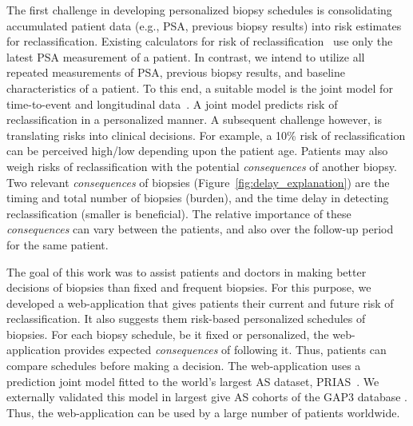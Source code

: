 The first challenge in developing personalized biopsy schedules is consolidating accumulated patient data (e.g., PSA, previous biopsy results) into risk estimates for reclassification. Existing calculators for risk of reclassification~\citep{partin1993use,makarov2007updated} use only the latest PSA measurement of a patient. In contrast, we intend to utilize all repeated measurements of PSA, previous biopsy results, and baseline characteristics of a patient. To this end, a suitable model is the joint model for time-to-event and longitudinal data~\citep{tomer2019, coley2017prediction,rizopoulos2012joint}. A joint model predicts risk of reclassification in a personalized manner. A subsequent challenge however, is translating risks into clinical decisions. For example, a 10\% risk of reclassification can be perceived high/low depending upon the patient age. Patients may also weigh risks of reclassification with the potential \textit{consequences} of another biopsy. Two relevant \textit{consequences} of biopsies (Figure~\ref{fig:delay_explanation}) are the timing and total number of biopsies (burden), and the time delay in detecting reclassification (smaller is beneficial). The relative importance of these \textit{consequences} can vary between the patients, and also over the follow-up period for the same patient.

The goal of this work was to assist patients and doctors in making better decisions of biopsies than fixed and frequent biopsies. For this purpose, we developed a web-application that gives patients their current and future risk of reclassification. It also suggests them risk-based personalized schedules of biopsies. For each biopsy schedule, be it fixed or personalized, the web-application provides expected \textit{consequences} of following it. Thus, patients can compare schedules before making a decision. The web-application uses a prediction joint model fitted to the world's largest AS dataset, PRIAS~\citep{bul2013active}. We externally validated this model in largest give AS cohorts of the GAP3 database \citep{gap3_2018}. Thus, the web-application can be used by a large number of patients worldwide.